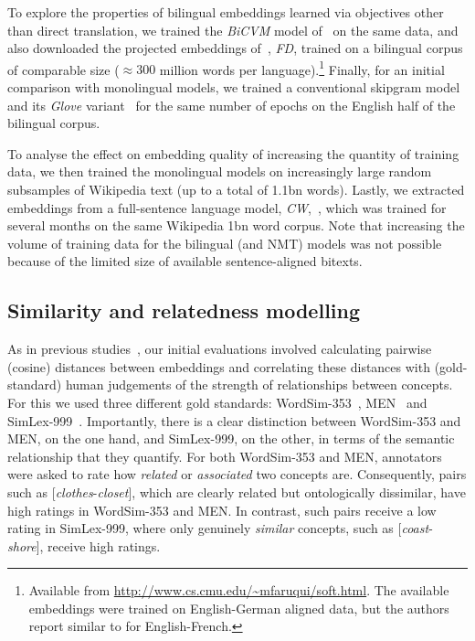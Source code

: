 To explore the properties of bilingual embeddings learned via objectives other than direct translation, we trained the \emph{BiCVM} model of~\cite{Hermann:2014:ICLR} on the same data, and also downloaded the projected embeddings of~\cite{faruqui2014improving}, \emph{FD}, trained on a bilingual corpus of comparable size (\(\approx 300\) million words per language).\footnote{Available from \url{http://www.cs.cmu.edu/~mfaruqui/soft.html}. The available embeddings were trained on English-German aligned data, but the authors report similar to for English-French.} Finally, for an initial comparison with monolingual models, we trained a conventional skipgram model~\cite{mikolov2013distributed} and its \emph{Glove} variant~\cite{Pennington2014} for the same number of epochs on the English half of the bilingual corpus. 

To analyse the effect on embedding quality of increasing the quantity of training data, we then trained the monolingual models on increasingly large random subsamples of Wikipedia text (up to a total of 1.1bn words). Lastly, we extracted embeddings from a full-sentence language model, \emph{CW},~\cite{collobert2008unified}, which was trained for several months on the same Wikipedia 1bn word corpus. Note that increasing the volume of training data for the bilingual (and NMT) models was not possible because of the limited size of available sentence-aligned bitexts. 
 
\subsection{Similarity and relatedness modelling}

As in previous studies~\cite{Agirre2009,bruni2014multimodal,baroni2014don}, our initial evaluations involved calculating pairwise (cosine) distances between embeddings and correlating these distances with (gold-standard) human judgements of the strength of relationships between concepts. For this we used three different gold standards: WordSim-353~\cite{Agirre2009}, MEN~\cite{bruni2014multimodal} and SimLex-999~\cite{hill2014simlex}. Importantly, there is a clear distinction between WordSim-353 and MEN, on the one hand, and SimLex-999, on the other, in terms of the semantic relationship that they quantify. For both WordSim-353 and MEN, annotators were asked to rate how \emph{related} or \emph{associated} two concepts are. Consequently, pairs such as [\emph{clothes}-\emph{closet}], which are clearly related but ontologically dissimilar, have high ratings in WordSim-353 and MEN. In contrast, such pairs receive a low rating in SimLex-999, where only genuinely \emph{similar} concepts, such as [\emph{coast}- \emph{shore}], receive high ratings. 

